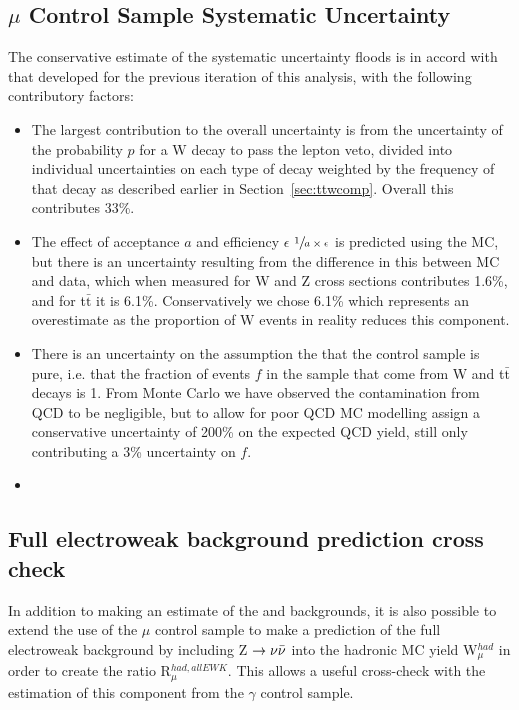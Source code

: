 \subsection{$\mu$ Control Sample Systematic Uncertainty}
The conservative estimate of the systematic uncertainty floods is in accord with that developed for the previous iteration of this analysis, with the following contributory factors:
\begin{itemize}
\item The largest contribution to the overall uncertainty is from the uncertainty of the probability $p$ for a W decay to pass the lepton veto, divided into individual uncertainties on each type of decay weighted by the frequency of that decay as described earlier in Section~\ref{sec:ttwcomp}. Overall this contributes 33\%.  
\item The effect of acceptance $a$ and efficiency $\epsilon$  $\sfrac{1}{a \times \epsilon}$ is predicted using the MC, but there is an uncertainty resulting from the difference in this between MC and data, which when measured for W and Z cross sections contributes 1.6\%, and for t$\bar{\textrm{t}}$ it is 6.1\%. Conservatively we chose 6.1\% which represents an overestimate as the proportion of W events in reality reduces this component. 
\item There is an uncertainty on the assumption the that the control sample is pure, i.e. that the fraction of events $f$ in the sample that come from W and t$\bar{\textrm{t}}$ decays is 1. From Monte Carlo we have observed the contamination from QCD to be negligible, but to allow for poor QCD MC modelling assign a conservative uncertainty of 200\% on the expected QCD yield, still only contributing a 3\% uncertainty on $f$. 
\item
\end{itemize}


\subsection{Full electroweak background prediction cross check}


In addition to making an estimate of the \ttj and \wj backgrounds, it is also possible to extend the use of the $\mu$ control sample to make a prediction of the full electroweak background by including Z $\rightarrow \nu \bar{\nu}$ into the hadronic MC yield W$^{had}_{\mu}$ in order to create the ratio R$^{had,allEWK}_{\mu}$. This allows a useful cross-check with the estimation of this component from the $\gamma$ control sample.  

